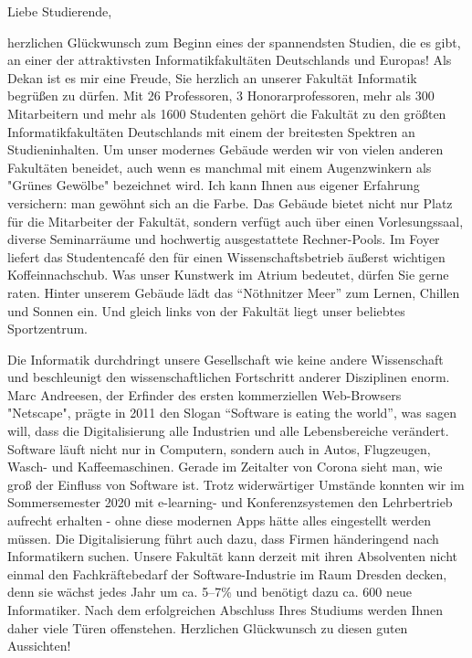 {\fontsize{10pt}{11}\selectfont

Liebe Studierende,

herzlichen Glückwunsch zum Beginn eines der spannendsten Studien, die es gibt, an  einer der attraktivsten Informatikfakultäten Deutschlands und Europas!  Als Dekan ist es mir eine Freude, Sie herzlich an unserer Fakultät  Informatik begrüßen zu dürfen. Mit 26 Professoren, 3 Honorarprofessoren, mehr als 300 Mitarbeitern und mehr als 1600 Studenten gehört die  Fakultät zu den größten Informatikfakultäten Deutschlands mit einem der  breitesten Spektren an Studieninhalten. Um unser modernes Gebäude werden wir von vielen anderen Fakultäten beneidet, auch wenn es manchmal mit  einem Augenzwinkern als "Grünes Gewölbe" bezeichnet wird. Ich  kann Ihnen aus eigener Erfahrung versichern: man gewöhnt sich an die  Farbe. Das Gebäude bietet nicht nur Platz für die Mitarbeiter der  Fakultät, sondern verfügt auch über einen Vorlesungssaal, diverse  Seminarräume und hochwertig ausgestattete Rechner-Pools. Im Foyer  liefert das Studentencafé \ascii{} den für einen Wissenschaftsbetrieb  äußerst wichtigen Koffeinnachschub. Was unser Kunstwerk im Atrium  bedeutet, dürfen Sie gerne raten. Hinter unserem Gebäude lädt das  \enquote{Nöthnitzer Meer} zum Lernen, Chillen und Sonnen ein. Und gleich links von der Fakultät liegt unser beliebtes Sportzentrum.

Die Informatik durchdringt unsere Gesellschaft wie keine andere  Wissenschaft und beschleunigt den wissenschaftlichen Fortschritt anderer Disziplinen enorm. Marc Andreesen, der Erfinder des ersten  kommerziellen Web-Browsers "Netscape", prägte in 2011 den Slogan \enquote{Software is eating the world}, was sagen will, dass die  Digitalisierung alle Industrien und alle Lebensbereiche verändert.  Software läuft nicht nur in Computern, sondern auch in Autos,  Flugzeugen, Wasch- und Kaffeemaschinen. Gerade im Zeitalter von Corona sieht man, wie groß der Einfluss von  Software ist. Trotz widerwärtiger Umstände konnten wir im Sommersemester 2020 mit e-learning- und Konferenzsystemen den Lehrbertrieb aufrecht erhalten - ohne diese modernen Apps hätte alles eingestellt werden müssen. Die Digitalisierung führt auch dazu, dass  Firmen händeringend nach Informatikern suchen. Unsere Fakultät kann  derzeit mit ihren Absolventen nicht einmal den Fachkräftebedarf der  Software-Industrie im Raum Dresden decken, denn sie wächst jedes Jahr um ca. 5--7\% und benötigt dazu ca. 600 neue Informatiker. Nach dem  erfolgreichen Abschluss Ihres Studiums werden Ihnen daher viele Türen  offenstehen. Herzlichen Glückwunsch zu diesen guten Aussichten!

}
